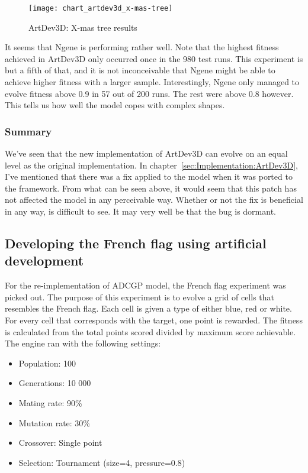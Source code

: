 \begin{figure}[!ht]
	\centering
	\texttt{[image: chart\_artdev3d\_x-mas-tree]}
	\caption{ArtDev3D: X-mas tree results}
	\label{fig:chart_artdev3d_x-mas-tree}
\end{figure}

It seems that Ngene is performing rather well. Note that the highest fitness achieved in ArtDev3D only occurred once in the 980 test runs. This experiment is but a fifth of that, and it is not inconceivable that Ngene might be able to achieve higher fitness with a larger sample. Interestingly, Ngene only managed to evolve fitness above 0.9 in 57 out of 200 runs. The rest were above 0.8 however. This tells us how well the model copes with complex shapes.

\subsubsection{Summary}
We've seen that the new implementation of ArtDev3D can evolve on an equal level as the original implementation. In chapter~\ref{sec:Implementation:ArtDev3D}, I've mentioned that there was a fix applied to the model when it was ported to the framework. From what can be seen above, it would seem that this patch has not affected the model in any perceivable way. Whether or not the fix is beneficial in any way, is difficult to see. It may very well be that the bug is dormant.


\subsection{Developing the French flag using artificial development}
For the re-implementation of ADCGP model, the French flag experiment was picked out. The purpose of this experiment is to evolve a grid of cells that resembles the French flag. Each cell is given a type of either blue, red or white. For every cell that corresponds with the target, one point is rewarded. The fitness is calculated from the total points scored divided by maximum score achievable. The engine ran with the following settings:

\begin{itemize}
	\itemsep=-2pt
	\item Population: 100
	\item Generations: 10 000
	\item Mating rate: 90\%
	\item Mutation rate: 30\%
	\item Crossover: Single point
	\item Selection: Tournament (size=4, pressure=0.8)
\end{itemize}


